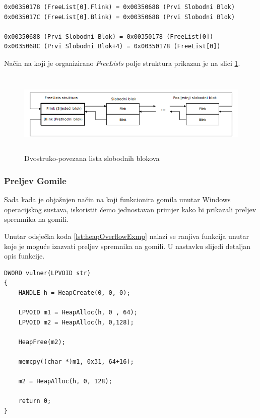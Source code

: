 \documentclass[times, utf8, diplomski, numeric]{fer}
\begin{document}
\begin{lstlisting}[frame=single, caption=Prvi slobodni blok gomile, label={lst:freeLists0}]
0x00350178 (FreeList[0].Flink) = 0x00350688 (Prvi Slobodni Blok)
0x0035017C (FreeList[0].Blink) = 0x00350688 (Prvi Slobodni Blok)

0x00350688 (Prvi Slobodni Blok) = 0x00350178 (FreeList[0])
0x0035068C (Prvi Slobodni Blok+4) = 0x00350178 (FreeList[0])
\end{lstlisting}

Način na koji je organizirano \emph{FreeLists} polje struktura
prikazan je na slici \ref{fig:free_lists_entries}.

\begin{figure}[!ht]
\centering
\setlength\fboxsep{0pt}
\setlength\fboxrule{0.5pt}
\includegraphics[width=15cm, height=4cm]{slike/free_lists_entries}
\caption{Dvostruko-povezana lista slobodnih blokova}
\label{fig:free_lists_entries} 
\end{figure}

\subsubsection{Preljev Gomile}

Sada kada je objašnjen način na koji funkcionira gomila unutar
Windows operacijskog sustava, iskoristit ćemo jednostavan primjer
kako bi prikazali preljev spremnika na gomili.

Unutar odsječka koda \ref{lst:heapOverflowExmp} nalazi se ranjiva
funkcija unutar koje je moguće izazvati preljev spremnika na
gomili. U nastavku slijedi detaljan opis funkcije.

\begin{lstlisting}[frame=single, caption=Primjer preljeva gomile, label={lst:heapOverflowExmp}]
DWORD vulner(LPVOID str)
{
    HANDLE h = HeapCreate(0, 0, 0);
 
    LPVOID m1 = HeapAlloc(h, 0 , 64);
    LPVOID m2 = HeapAlloc(h, 0,128);
 
    HeapFree(m2);

    memcpy((char *)m1, 0x31, 64+16);
 
    m2 = HeapAlloc(h, 0, 128);
 
    return 0;
}
\end{lstlisting}
\end{document}
